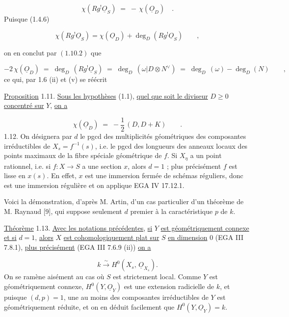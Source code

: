 \begin{equation*}
\chi(Rg^{!}\underline{O}_S) \;=\; -\,\chi(\underline{O}_D) \quad .
\end{equation*}
Puisque (1.4.6)

\begin{equation*}
\chi(Rg^{!}\underline{O}_S) = \chi(\underline{O}_D) + \deg_D(Rg^{!}\underline{O}_S) \qquad , 
\end{equation*}


 on en conclut par $(1.10.2)$ que

\begin{equation*}
- 2\,\chi(\underline{O}_D) \;=\; \deg_D\,(Rg^{!}\underline{O}_S) \;=\; \deg_D\,(\omega|D \otimes N^{\vee}) \;=\; \deg_D\,(\omega) - \deg_D(N) \qquad ,
\end{equation*}
ce qui, par 1.6 (ii) et (v) se réécrit

\underline{Proposition} 1.11. \underline{Sous les hypothèses} (1.1), \underline{quel que soit le diviseur} $D \geq 0$ \underline{concentré sur} $Y$, \underline{on a}

\begin{equation*}
\chi(\underline{O}_D) \;=\; - \frac{1}{2}\,(D,D+K) \qquad .
\end{equation*}
1.12. On désignera par $d$ le pgcd des multiplicités géométriques des composantes irréductibles de $X_s = f^{-1}(s)$, i.e. le pgcd des longueurs des anneaux locaux des points maximaux de la fibre spéciale géométrique de $f$. Si $X_{\eta}$ a un point rationnel, i.e. si $f : X \longrightarrow S$ a une section $x$, alors $d = 1$ ; plus précisément $f$ est lisse en $x(s)$. En effet, $x$ est une immersion fermée de schémas réguliers, donc est une immersion régulière et on applique EGA IV 17.12.1.

Voici la démonstration, d'après M. Artin, d'un cas particulier d'un théorème de M. Raynaud [9], qui suppose seulement $d$ premier à la caractéristique $p$ de $k$.

\underline{Théorème} 1.13. \underline{Avec les notations précédentes}, \underline{si} $Y$ \underline{est géométriquement connexe et si} $d = 1$, \underline{alors} $X$ \underline{est cohomologiquement plat sur} $S$ \underline{en dimension} 0 (EGA III 7.8.1), \underline{plus précisément} (EGA III 7.6.9 (ii)) \underline{on a}

\begin{equation*}
k \xrightarrow{\;\sim\;} H^0(X_s,\, \underline{O}_{X_s}).
\end{equation*}
On se ramène aisément au cas où $S$ est strictement local. Comme $Y$ est géométriquement connexe, $H^0(Y,\underline{O}_Y)$ est une extension radicielle de $k$, et puisque $(d,p)=1$, une au moins des composantes irréductibles de $Y$ est
géométriquement réduite, et on en déduit facilement que $H^0(Y,\underline{O}_Y) = k$.

